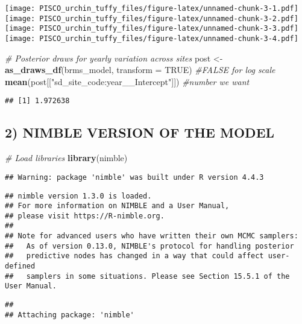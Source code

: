 \documentclass[
]{article}
\newenvironment{Shaded}{\begin{snugshade}}{\end{snugshade}}
\newcommand{\AttributeTok}[1]{\textcolor[rgb]{0.13,0.29,0.53}{#1}}
\newcommand{\CommentTok}[1]{\textcolor[rgb]{0.56,0.35,0.01}{\textit{#1}}}
\newcommand{\ConstantTok}[1]{\textcolor[rgb]{0.56,0.35,0.01}{#1}}
\newcommand{\FunctionTok}[1]{\textcolor[rgb]{0.13,0.29,0.53}{\textbf{#1}}}
\newcommand{\NormalTok}[1]{#1}
\newcommand{\OtherTok}[1]{\textcolor[rgb]{0.56,0.35,0.01}{#1}}
\newcommand{\StringTok}[1]{\textcolor[rgb]{0.31,0.60,0.02}{#1}}
\begin{document}
\texttt{[image: PISCO\_urchin\_tuffy\_files/figure-latex/unnamed-chunk-3-1.pdf]}
\texttt{[image: PISCO\_urchin\_tuffy\_files/figure-latex/unnamed-chunk-3-2.pdf]}
\texttt{[image: PISCO\_urchin\_tuffy\_files/figure-latex/unnamed-chunk-3-3.pdf]}
\texttt{[image: PISCO\_urchin\_tuffy\_files/figure-latex/unnamed-chunk-3-4.pdf]}

\begin{Shaded}
\begin{Highlighting}[]
\CommentTok{\# Posterior draws for yearly variation across sites}
\NormalTok{post }\OtherTok{\textless{}{-}} \FunctionTok{as\_draws\_df}\NormalTok{(brms\_model, }\AttributeTok{transform =} \ConstantTok{TRUE}\NormalTok{) }\CommentTok{\#FALSE for log scale}
\FunctionTok{mean}\NormalTok{(post[[}\StringTok{"sd\_site\_code:year\_\_Intercept"}\NormalTok{]]) }\CommentTok{\#number we want}
\end{Highlighting}
\end{Shaded}

\begin{verbatim}
## [1] 1.972638
\end{verbatim}

\subsection{2) NIMBLE VERSION OF THE
MODEL}\label{nimble-version-of-the-model}

\begin{Shaded}
\begin{Highlighting}[]
\CommentTok{\# Load libraries}
\FunctionTok{library}\NormalTok{(nimble)}
\end{Highlighting}
\end{Shaded}

\begin{verbatim}
## Warning: package 'nimble' was built under R version 4.4.3
\end{verbatim}

\begin{verbatim}
## nimble version 1.3.0 is loaded.
## For more information on NIMBLE and a User Manual,
## please visit https://R-nimble.org.
## 
## Note for advanced users who have written their own MCMC samplers:
##   As of version 0.13.0, NIMBLE's protocol for handling posterior
##   predictive nodes has changed in a way that could affect user-defined
##   samplers in some situations. Please see Section 15.5.1 of the User Manual.
\end{verbatim}

\begin{verbatim}
## 
## Attaching package: 'nimble'
\end{verbatim}
\end{document}
